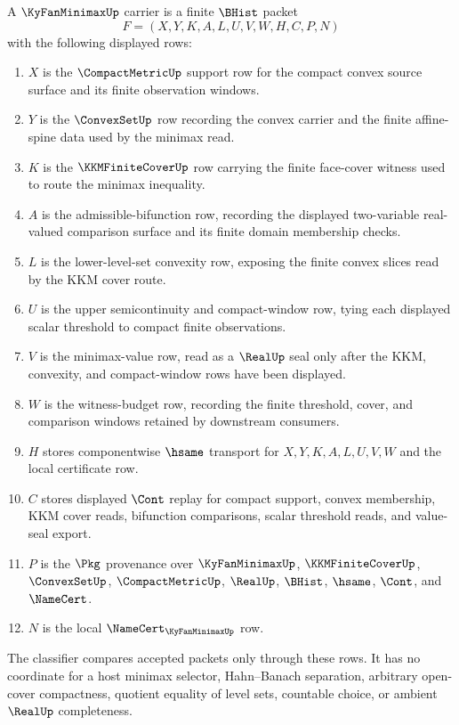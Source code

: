 \begin{definition}
\label{def:ky-fan-minimax-carrier}
A $\KyFanMinimaxUp$ carrier is a finite $\BHist$ packet
$$
F=(X,Y,K,A,L,U,V,W,H,C,P,N)
$$
with the following displayed rows:
\begin{enumerate}
\item $X$ is the $\CompactMetricUp$ support row for the compact convex source surface and its finite observation windows.
\item $Y$ is the $\ConvexSetUp$ row recording the convex carrier and the finite affine-spine data used by the minimax read.
\item $K$ is the $\KKMFiniteCoverUp$ row carrying the finite face-cover witness used to route the minimax inequality.
\item $A$ is the admissible-bifunction row, recording the displayed two-variable real-valued comparison surface and its finite domain membership checks.
\item $L$ is the lower-level-set convexity row, exposing the finite convex slices read by the KKM cover route.
\item $U$ is the upper semicontinuity and compact-window row, tying each displayed scalar threshold to compact finite observations.
\item $V$ is the minimax-value row, read as a $\RealUp$ seal only after the KKM, convexity, and compact-window rows have been displayed.
\item $W$ is the witness-budget row, recording the finite threshold, cover, and comparison windows retained by downstream consumers.
\item $H$ stores componentwise $\hsame$ transport for $X,Y,K,A,L,U,V,W$ and the local certificate row.
\item $C$ stores displayed $\Cont$ replay for compact support, convex membership, KKM cover reads, bifunction comparisons, scalar threshold reads, and value-seal export.
\item $P$ is the $\Pkg$ provenance over $\KyFanMinimaxUp$, $\KKMFiniteCoverUp$, $\ConvexSetUp$, $\CompactMetricUp$, $\RealUp$, $\BHist$, $\hsame$, $\Cont$, and $\NameCert$.
\item $N$ is the local $\NameCert_{\KyFanMinimaxUp}$ row.
\end{enumerate}
The classifier compares accepted packets only through these rows. It has no coordinate for a host minimax selector, Hahn--Banach separation, arbitrary open-cover compactness, quotient equality of level sets, countable choice, or ambient $\RealUp$ completeness.
\end{definition}


